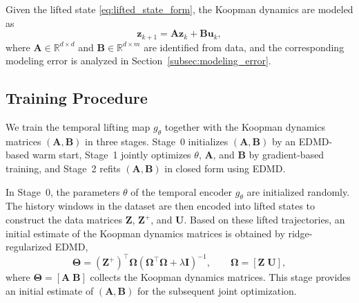 \documentclass[journal]{IEEEtran}
\newcommand{\vu}{\mathbf{u}}
\newcommand{\vz}{\mathbf{z}}
\newcommand{\mA}{\mathbf{A}}
\newcommand{\mB}{\mathbf{B}}
\newcommand{\mZ}{\mathbf{Z}}
\newcommand{\mU}{\mathbf{U}}
\newcommand{\mI}{\mathbf{I}}
\newcommand{\mTheta}{\boldsymbol{\Theta}}
\newcommand{\mOmega}{\boldsymbol{\Omega}}
\begin{document}
Given the lifted state \eqref{eq:lifted_state_form}, the Koopman dynamics are modeled as
\begin{equation}
    \vz_{k+1} = \mA \vz_k + \mB \vu_k,
    \label{eq:temporal_dynamics}
\end{equation}
where $\mA \in \mathbb{R}^{d\times d}$ and $\mB \in \mathbb{R}^{d\times m}$ are identified from data, and the corresponding modeling error is analyzed in Section~\ref{subsec:modeling_error}.

\subsection{Training Procedure}
\label{sec:training}

We train the temporal lifting map $g_\theta$ together with the Koopman dynamics matrices $(\mA,\mB)$ in three stages. Stage~0 initializes $(\mA,\mB)$ by an EDMD-based warm start, Stage~1 jointly optimizes $\theta$, $\mA$, and $\mB$ by gradient-based training, and Stage~2 refits $(\mA,\mB)$ in closed form using EDMD.

In Stage~0, the parameters $\theta$ of the temporal encoder $g_\theta$ are initialized randomly. The history windows in the dataset are then encoded into lifted states to construct the data matrices $\mZ$, $\mZ^{+}$, and $\mU$. Based on these lifted trajectories, an initial estimate of the Koopman dynamics matrices is obtained by ridge-regularized EDMD,
\begin{equation}
    \mTheta = (\mZ^{+})^\top \mOmega
    \left(\mOmega^\top \mOmega + \lambda \mI\right)^{-1},
    \qquad
    \mOmega = [\mZ\;\mU],
    \label{eq:edmd_solution}
\end{equation}
where $\mTheta = [\mA\;\mB]$ collects the Koopman dynamics matrices. This stage provides an initial estimate of $(\mA,\mB)$ for the subsequent joint optimization.
\end{document}
